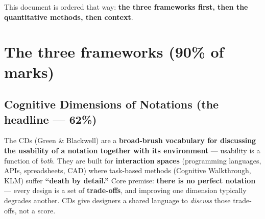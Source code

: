 \documentclass[11pt,a4paper]{article}
\begin{document}
This document is ordered that way: \textbf{the three frameworks first, then the quantitative methods, then context}.

\hrulefill

\section{The three frameworks (90\% of marks)}

\subsection{Cognitive Dimensions of Notations (the headline --- 62\%)}

\begin{must}
The CDs (Green \& Blackwell) are a \textbf{broad-brush vocabulary for discussing the usability of a notation together with its environment} --- usability is a function of \emph{both}. They are built for \textbf{interaction spaces} (programming languages, APIs, spreadsheets, CAD) where task-based methods (Cognitive Walkthrough, KLM) suffer \textbf{``death by detail.''} Core premise: \textbf{there is no perfect notation} --- every design is a set of \textbf{trade-offs}, and improving one dimension typically degrades another. CDs give designers a shared language to \emph{discuss} those trade-offs, not a score.
\end{must}
\end{document}
